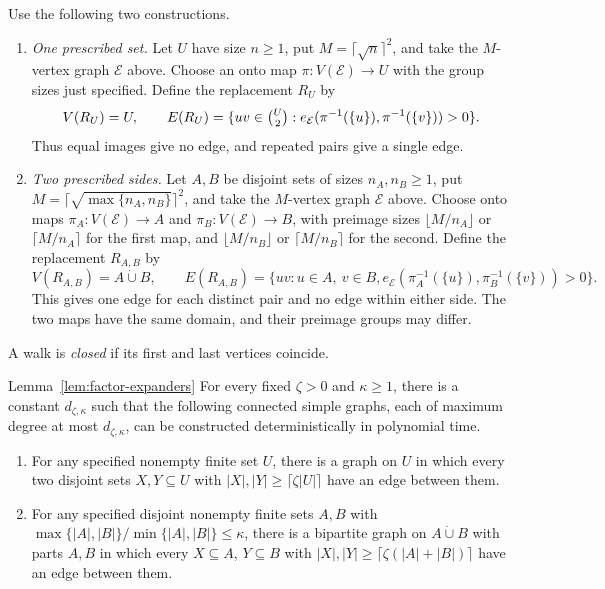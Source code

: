 Use the following two constructions.
\begin{enumerate}
 \item\label{constr:one-set-replacement} \emph{One prescribed set.}
 Let $U$ have size $n\ge1$, put $M=\lceil\sqrt n\rceil^2$, and
 take the $M$-vertex graph $\mathcal E$ above. Choose an onto map
 $\pi:V(\mathcal E)\to U$ with the group sizes just specified.
 Define the replacement $R_U$ by
 \[
 V(R_U)=U,
 \qquad E(R_U)=\{uv\in\tbinom{U}{2}:
 e_{\mathcal E}(\pi^{-1}(\{u\}),\pi^{-1}(\{v\}))>0\}.
 \]
 Thus equal images give no edge, and repeated pairs give a single edge.
 \item\label{constr:two-side-replacement} \emph{Two prescribed sides.}
 Let $A,B$ be disjoint sets of sizes $n_A,n_B\ge1$, put
 $M=\lceil\sqrt{\max\{n_A,n_B\}}\rceil^2$, and take the
 $M$-vertex graph $\mathcal E$ above. Choose onto maps
 $\pi_A:V(\mathcal E)\to A$ and
 $\pi_B:V(\mathcal E)\to B$, with preimage sizes
 $\lfloor M/n_A\rfloor$ or $\lceil M/n_A\rceil$ for the first
 map, and $\lfloor M/n_B\rfloor$ or $\lceil M/n_B\rceil$ for
 the second. Define the replacement $R_{A,B}$ by
 \[
 V(R_{A,B})=A\mathbin{\dot\cup}B,
 \qquad E(R_{A,B})=\{uv:u\in A,\ v\in B,
 e_{\mathcal E}(\pi_A^{-1}(\{u\}),\pi_B^{-1}(\{v\}))>0\}.
 \]
 This gives one edge for each distinct pair and no edge within
 either side. The two maps have the same
 domain, and their preimage groups may differ.
\end{enumerate}

A walk is \emph{closed} if its first and last vertices coincide.

\begin{restatedlemma}{Lemma~\ref{lem:factor-expanders}}
For every fixed $\zeta>0$ and $\kappa\geq1$, there is a constant
$d_{\zeta,\kappa}$ such that the following connected simple graphs,
each of maximum degree at most $d_{\zeta,\kappa}$, can be constructed
deterministically in polynomial time.
\begin{enumerate}
 \item For any specified nonempty finite set $U$, there is a graph on
 $U$ in which every two disjoint sets $X,Y\subseteq U$ with
 $|X|,|Y|\geq\lceil\zeta|U|\rceil$ have an edge between them.
 \item For any specified disjoint nonempty finite sets $A,B$ with
 $\max\{|A|,|B|\}/\min\{|A|,|B|\}\leq\kappa$, there is a bipartite
 graph on $A\mathbin{\dot\cup}B$ with parts $A,B$ in which every
 $X\subseteq A$, $Y\subseteq B$ with
 $|X|,|Y|\geq\lceil\zeta(|A|+|B|)\rceil$ have an edge between them.
\end{enumerate}
\end{restatedlemma}

